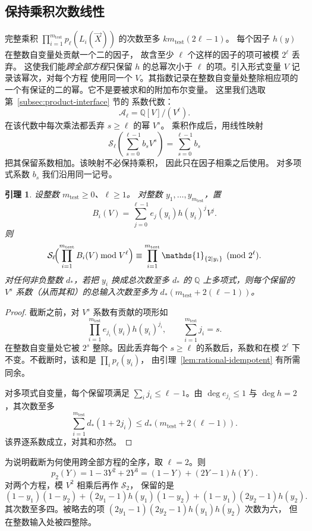 \documentclass[11pt,reqno]{amsart}
\numberwithin{equation}{section}
\newtheorem{lemma}[theorem]{引理}
\theoremstyle{definition}\newtheorem{definition}[theorem]{定义}
\theoremstyle{remark}\newtheorem{remark}[theorem]{注}
\renewcommand{\le}{\leqslant}
\renewcommand{\ge}{\geqslant}
\begin{document}
\subsection{保持乘积次数线性}
完整乘积 $\prod_{i=1}^{m_{\mathrm{test}}} p_\ell(L_i(\vec{X}))$
的次数至多 $km_{\mathrm{test}}(2\ell-1)$。
每个因子 $h(y)$ 在整数自变量处贡献一个二的因子，
故含至少 $\ell$ 个这样的因子的项可被模 $2^\ell$ 丢弃。
这使我们能\emph{跨全部方程}只保留 $h$ 的总幂次小于
$\ell$ 的项。引入形式变量 $V$ 记录该幂次，对每个方程
使用同一个 $V$。其指数记录在整数自变量处整除相应项的
一个有保证的二的幂。它不是要被求和的附加布尔变量。
这里我们选取第~\ref{subsec:product-interface} 节的
系数代数：
\[
 \mathcal A_\ell=\mathbb Q[V]/(V^\ell).
\]
在该代数中每次乘法都丢弃 $s\ge\ell$ 的幂 $V^s$。
乘积作成后，用线性映射
\[
 \mathcal S_\ell\!\left(\sum_{s=0}^{\ell-1}b_sV^s\right)
 =\sum_{s=0}^{\ell-1}b_s
\]
把其保留系数相加。该映射不必保持乘积，
因此只在因子相乘之后使用。
对多项式系数 $b_s$ 我们沿用同一记号。

\begin{lemma}\label{lem:total-order}
设整数 $m_{\mathrm{test}}\ge0$、$\ell\ge1$。
对整数 $y_1,\ldots,y_{m_{\mathrm{test}}}$，置
\[
 B_i(V)=\sum_{j=0}^{\ell-1}e_j(y_i)h(y_i)^jV^j.
\]
则
\[
 \mathcal S_\ell\!\Bigl(\prod_{i=1}^{m_{\mathrm{test}}} B_i(V)\bmod V^\ell\Bigr)
 \equiv\prod_{i=1}^{m_{\mathrm{test}}}\mathds{1}_{\{2\mid y_i\}}\pmod{2^\ell}.
\]
对任何非负整数 $d_*$，若把 $y_i$ 换成总次数至多 $d_*$
的 $\mathbb Q$ 上多项式，则每个保留的 $V^s$
系数（从而其和）的总输入次数至多为
$d_*(m_{\mathrm{test}}+2(\ell-1))$。
\end{lemma}
\begin{proof}
截断之前，对 $V^s$ 系数有贡献的项形如
\[
 \prod_{i=1}^{m_{\mathrm{test}}} e_{j_i}(y_i)h(y_i)^{j_i},
 \qquad \sum_{i=1}^{m_{\mathrm{test}}} j_i=s.
\]
在整数自变量处它被 $2^s$ 整除。因此丢弃每个
$s\ge\ell$ 的系数后，系数和在模 $2^\ell$
下不变。不截断时，该和是 $\prod_i p_\ell(y_i)$，
由引理~\ref{lem:rational-idempotent} 有所需同余。

对多项式自变量，每个保留项满足
$\sum_i j_i\le\ell-1$。由 $\deg e_{j_i}\le1$
与 $\deg h=2$，其次数至多
\[
 \sum_{i=1}^{m_{\mathrm{test}}} d_*(1+2j_i)
 \le d_*(m_{\mathrm{test}}+2(\ell-1)).
\]
该界逐系数成立，对其和亦然。
\end{proof}

为说明截断为何使用跨全部方程的全序，取 $\ell=2$。则
\[
 p_2(Y)=1-3Y^2+2Y^3=(1-Y)+(2Y-1)h(Y).
\]
对两个方程，模 $V^2$ 相乘后再作 $\mathcal S_2$，
保留的是
\[
 (1-y_1)(1-y_2)
 +(2y_1-1)h(y_1)(1-y_2)
 +(1-y_1)(2y_2-1)h(y_2).
\]
其次数至多四。被略去的项
$(2y_1-1)(2y_2-1)h(y_1)h(y_2)$ 次数为六，
但在整数输入处被四整除。
\end{document}
